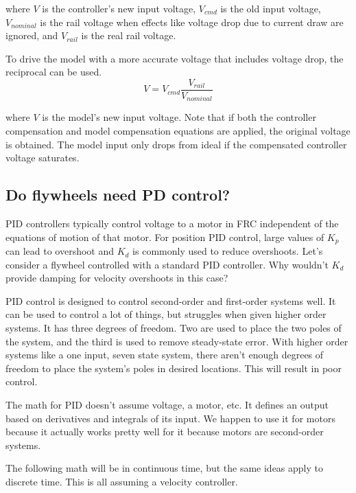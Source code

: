 where $V$ is the \gls{controller}'s new input voltage, $V_{cmd}$ is the old
input voltage, $V_{nominal}$ is the rail voltage when effects like voltage drop
due to current draw are ignored, and $V_{rail}$ is the real rail voltage.

To drive the \gls{model} with a more accurate voltage that includes voltage
drop, the reciprocal can be used.
\begin{equation}
  V = V_{cmd} \frac{V_{rail}}{V_{nominal}}
\end{equation}

where $V$ is the \gls{model}'s new input voltage. Note that if both the
\gls{controller} compensation and \gls{model} compensation equations are
applied, the original voltage is obtained. The \gls{model} input only drops from
ideal if the compensated \gls{controller} voltage saturates.

\subsection{Do flywheels need PD control?}
\label{subsec:do_flywheels_need_pd_control}

PID controllers typically control voltage to a motor in FRC independent of the
equations of motion of that motor. For position PID control, large values of
$K_p$ can lead to overshoot and $K_d$ is commonly used to reduce overshoots.
Let's consider a flywheel controlled with a standard PID controller. Why
wouldn't $K_d$ provide damping for velocity overshoots in this case?

PID control is designed to control second-order and first-order \glspl{system}
well. It can be used to control a lot of things, but struggles when given higher
order \glspl{system}. It has three degrees of freedom. Two are used to place the
two poles of the \gls{system}, and the third is used to remove steady-state
error. With higher order \glspl{system} like a one input, seven \gls{state}
\gls{system}, there aren't enough degrees of freedom to place the \gls{system}'s
poles in desired locations. This will result in poor control.

The math for PID doesn't assume voltage, a motor, etc. It defines an output
based on derivatives and integrals of its input. We happen to use it for motors
because it actually works pretty well for it because motors are second-order
\glspl{system}.

The following math will be in continuous time, but the same ideas apply to
discrete time. This is all assuming a velocity controller.

